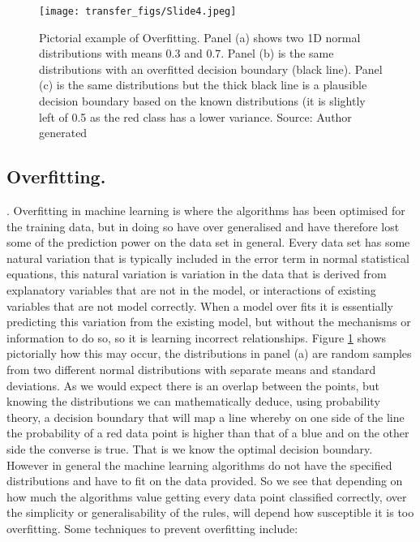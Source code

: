 \begin{figure}
  \texttt{[image: transfer\_figs/Slide4.jpeg]}
  \caption[Pictorial example of Overfitting.]{Pictorial example of Overfitting. Panel (a) shows two 1D normal distributions with means 0.3 and 0.7. Panel (b) is the same distributions with an overfitted decision boundary (black line). Panel (c) is the same distributions but the thick black line is a plausible decision boundary based on the known distributions (it is slightly left of 0.5 as the red class has a lower variance. Source: Author generated}
  \label{fig:overfit}
\end{figure}



\subsection{Overfitting.} \parencite{chollet_allaire_2018}. Overfitting in machine learning is where the algorithms has been optimised for the training data, but in doing so have over generalised and have therefore lost some of the prediction power on the data set in general. Every data set has some natural variation that is typically included in the error term in normal statistical equations, this natural variation is variation in the data that is derived from explanatory variables that are not in the model, or interactions of existing variables that are not model correctly. When a model over fits it is essentially predicting this variation from the existing model, but without the mechanisms or information to do so, so it is learning incorrect relationships. Figure \ref{fig:overfit} shows pictorially how this may occur, the distributions in panel (a) are random samples from two different normal distributions with separate means and standard deviations. As we would expect there is an overlap between the points, but knowing the distributions we can mathematically deduce, using probability theory, a decision boundary that will map a line whereby on one side of the line the probability of a red data point is higher than that of a blue and on the other side the converse is true. That is we know the optimal decision boundary. However in general the machine learning algorithms do not have the specified distributions and have to fit on the data provided. So we see that depending on how much the algorithms value getting every data point classified correctly, over the simplicity or generalisability of the rules, will depend how susceptible it is too overfitting. Some techniques to prevent overfitting include:
